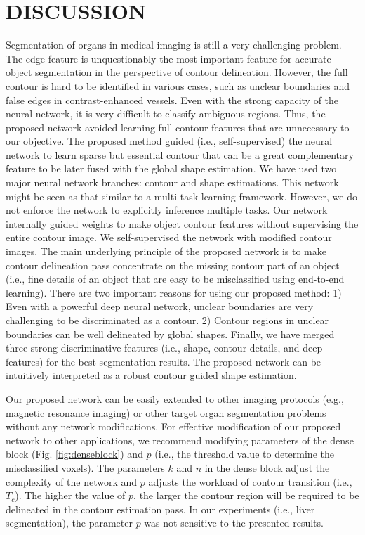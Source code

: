 \documentclass[journal]{IEEEtran}
\begin{document}
\section{DISCUSSION}
Segmentation of organs in medical imaging is still a very challenging problem. The edge feature is unquestionably the most important feature for accurate object segmentation in the perspective of contour delineation. However, the full contour is hard to be identified in various cases, such as unclear boundaries and false edges in contrast-enhanced vessels. Even with the strong capacity of the neural network, it is very difficult to classify ambiguous regions. Thus, the proposed network avoided learning full contour features that are unnecessary to our objective. The proposed method guided (i.e., self-supervised) the neural network to learn sparse but essential contour that can be a great complementary feature to be later fused with the global shape estimation. We have used two major neural network branches: contour and shape estimations. This network might be seen as that similar to a multi-task learning framework. However, we do not enforce the network to explicitly inference multiple tasks. Our network internally guided weights to make object contour features without supervising the entire contour image. We self-supervised the network with modified contour images. The main underlying principle of the proposed network is to make contour delineation pass concentrate on the missing contour part of an object (i.e., fine details of an object that are easy to be misclassified using end-to-end learning). There are two important reasons for using our proposed method: 1) Even with a powerful deep neural network, unclear boundaries are very challenging to be discriminated as a contour. 2) Contour regions in unclear boundaries can be well delineated by global shapes. Finally, we have merged three strong discriminative features (i.e., shape, contour details, and deep features) for the best segmentation results. The proposed network can be intuitively interpreted as a robust contour guided shape estimation.\par

Our proposed network can be easily extended to other imaging protocols (e.g., magnetic resonance imaging) or other target organ segmentation problems without any network modifications. For effective modification of our proposed network to other applications, we recommend modifying parameters of the dense block (Fig. \ref{fig:denseblock}) and \(p\) (i.e., the threshold value to determine the misclassified voxels). The parameters \(k\) and \(n\) in the dense block adjust the complexity of the network and \(p\) adjusts the workload of contour transition (i.e., \(T_c\)). The higher the value of \(p\), the larger the contour region will be required to be delineated in the contour estimation pass. In our experiments (i.e., liver segmentation), the parameter \(p\) was not sensitive to the presented results.\par
\end{document}
